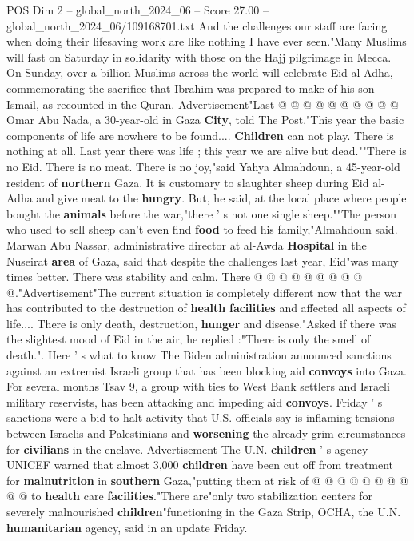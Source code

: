 \begin{textsample}{POS Dim 2 – global\_north\_2024\_06 – Score 27.00 – global\_north\_2024\_06/109168701.txt}
And the challenges our staff are facing when doing their lifesaving work are like nothing I have ever seen."Many Muslims will fast on Saturday in solidarity with those on the Hajj pilgrimage in Mecca.
On Sunday, over a billion Muslims across the world will celebrate Eid al-Adha, commemorating the sacrifice that Ibrahim was prepared to make of his son Ismail, as recounted in the Quran.
Advertisement"Last @ @ @ @ @ @ @ @ @ @ Omar Abu Nada, a 30-year-old in Gaza \textbf{City}, told The Post."This year the basic components of life are nowhere to be found.... \textbf{Children} can not play.
There is nothing at all.
Last year there was life ; this year we are alive but dead.""There is no Eid.
There is no meat.
There is no joy,"said Yahya Almahdoun, a 45-year-old resident of \textbf{northern} Gaza.
It is customary to slaughter sheep during Eid al-Adha and give meat to the \textbf{hungry}.
But, he said, at the local place where people bought the \textbf{animals} before the war,"there ' s not one single sheep.""The person who used to sell sheep can't even find \textbf{food} to feed his family,"Almahdoun said.
Marwan Abu Nassar, administrative director at al-Awda \textbf{Hospital} in the Nuseirat \textbf{area} of Gaza, said that despite the challenges last year, Eid"was many times better.
There was stability and calm.
There @ @ @ @ @ @ @ @ @ @."Advertisement"The current situation is completely different now that the war has contributed to the destruction of \textbf{health} \textbf{facilities} and affected all aspects of life....
There is only death, destruction, \textbf{hunger} and disease."Asked if there was the slightest mood of Eid in the air, he replied :"There is only the smell of death.".
Here ' s what to know The Biden administration announced sanctions against an extremist Israeli group that has been blocking aid \textbf{convoys} into Gaza.
For several months Tsav 9, a group with ties to West Bank settlers and Israeli military reservists, has been attacking and impeding aid \textbf{convoys}.
Friday ' s sanctions were a bid to halt activity that U.S. officials say is inflaming tensions between Israelis and Palestinians and \textbf{worsening} the already grim circumstances for \textbf{civilians} in the enclave.
Advertisement The U.N. \textbf{children} ' s agency UNICEF warned that almost 3,000 \textbf{children} have been cut off from treatment for \textbf{malnutrition} in \textbf{southern} Gaza,"putting them at risk of @ @ @ @ @ @ @ @ @ @ to \textbf{health} care \textbf{facilities}."There are"only two stabilization centers for severely malnourished \textbf{children}"functioning in the Gaza Strip, OCHA, the U.N. \textbf{humanitarian} agency, said in an update Friday.

\end{textsample}
